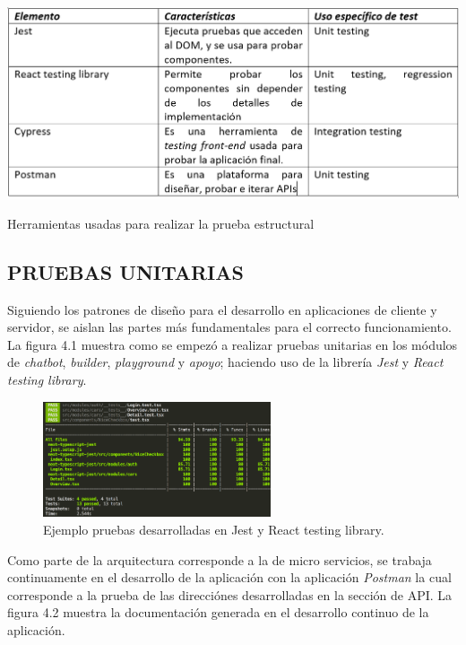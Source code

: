 \documentclass[letter, openright, 12pt]{book}
\begin{document}
{\begin{table}[H]
\includegraphics[width=1\textwidth]{tabla4_1}
\caption{Herramientas usadas para realizar la prueba estructural } 
\label{tab:tabla4_1} 
\end{table}

\subsection{PRUEBAS UNITARIAS}

Siguiendo los patrones de diseño para el desarrollo en aplicaciones de cliente y servidor, se aislan las partes más fundamentales para el correcto funcionamiento. La figura 4.1 muestra como se empezó a realizar pruebas unitarias en los módulos de \textit{chatbot}, \textit{builder}, \textit{playground} y \textit{apoyo}; haciendo uso de la librería \textit{Jest} y \textit{React testing library}. 

\begin{figure}[H]
\centering
\includegraphics[width=0.6\textwidth]{figura4_1}
 \caption{Ejemplo pruebas desarrolladas en Jest y React testing library.  }
\label{fig:figura4_1}
\end{figure}

\par
Como parte de la arquitectura corresponde a la de micro servicios, se trabaja continuamente en el desarrollo de la aplicación con la aplicación \textit{Postman} la cual corresponde a la prueba de las direcciónes desarrolladas en la sección de API. La figura 4.2 muestra la documentación generada en el desarrollo continuo de la aplicación. 

}
\end{document}
